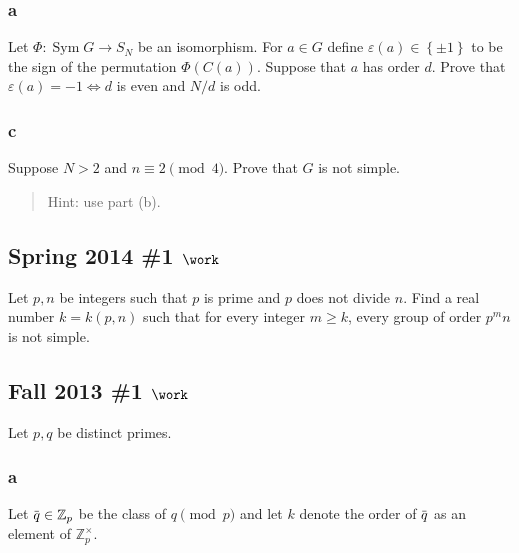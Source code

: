 \hypertarget{a-28}{%
\subsubsection{a}\label{a-28}}

Let \(\Phi: \operatorname{Sym}G\to S_N\) be an isomorphism. For
\(a\in G\) define \(\varepsilon(a) \in \left\{{\pm 1}\right\}\) to be
the sign of the permutation \(\Phi(C(a))\). Suppose that \(a\) has order
\(d\). Prove that \(\varepsilon(a) = -1 \iff d\) is even and \(N/d\) is
odd.

\hypertarget{c-15}{%
\subsubsection{c}\label{c-15}}

Suppose \(N> 2\) and \(n\equiv 2 \pmod 4\). Prove that \(G\) is not
simple.

\begin{quote}
Hint: use part (b).
\end{quote}

\hypertarget{spring-2014-1-work}{%
\subsection{\texorpdfstring{Spring 2014 \#1
\(\work\)}{Spring 2014 \#1 \textbackslash work}}\label{spring-2014-1-work}}

Let \(p, n\) be integers such that \(p\) is prime and \(p\) does not
divide \(n\). Find a real number \(k = k (p, n)\) such that for every
integer \(m\geq k\), every group of order \(p^m n\) is not simple.

\hypertarget{fall-2013-1-work}{%
\subsection{\texorpdfstring{Fall 2013 \#1
\(\work\)}{Fall 2013 \#1 \textbackslash work}}\label{fall-2013-1-work}}

Let \(p, q\) be distinct primes.

\hypertarget{a-29}{%
\subsubsection{a}\label{a-29}}

Let
\(\mkern 1.5mu\overline{\mkern-1.5muq\mkern-1.5mu}\mkern 1.5mu \in {\mathbb{Z}}_p\)
be the class of \(q\pmod p\) and let \(k\) denote the order of
\(\mkern 1.5mu\overline{\mkern-1.5muq\mkern-1.5mu}\mkern 1.5mu\) as an
element of \({\mathbb{Z}}_p^{\times}\).

